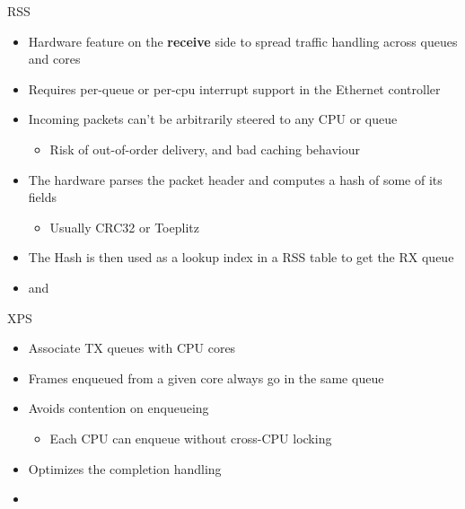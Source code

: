 \begin{frame}{RSS}
	\begin{itemize}
		\item Hardware feature on the \textbf{receive} side to spread traffic handling across queues and cores
		\item Requires per-queue or per-cpu interrupt support in the Ethernet controller
		\item Incoming packets can't be arbitrarily steered to any CPU or queue
			\begin{itemize}
				\item Risk of out-of-order delivery, and bad caching behaviour
			\end{itemize}
		\item The hardware parses the packet header and computes a hash of some of its fields
			\begin{itemize}
				\item Usually CRC32 or Toeplitz
			\end{itemize}
		\item The Hash is then used as a lookup index in a RSS table to get the RX queue
		\item {} and 
	\end{itemize}
\end{frame}

\begin{frame}{XPS}
	\begin{itemize}
		\item Associate TX queues with CPU cores
		\item Frames enqueued from a given core always go in the same queue
		\item Avoids contention on enqueueing
			\begin{itemize}
				\item Each CPU can enqueue without cross-CPU locking
			\end{itemize}
		\item Optimizes the completion handling
		\item {}
	\end{itemize}
\end{frame}

